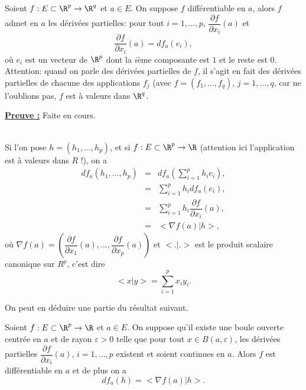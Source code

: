 \documentclass[class=report,crop=false]{standalone}
\begin{document}
 


 \begin{proposition} \label{diffder}
\textcolor[rgb]{0.50,0.00,0.25}{
Soient $f: E \subset \R^p \rightarrow \R^q$ et $a \in E$. On suppose $f$ différentiable en
$a$, alors $f$ admet en $a$ les dérivées partielles: pour tout $i=1,...,p$, $\dfrac{\partial f}{\partial x_i }(a)$ et 
\begin{equation*}
\dfrac{\partial f}{\partial x_i }(a)=df_a(e_i),
\end{equation*}
où $e_i$ est un vecteur de $\R^p$ dont  la $i$ème composante est $1$ et le reste est $0$.\\
Attention: quand on parle des dérivées partielles  de $f$, il s'agit en fait des dérivées partielles
de chacune des applications $f_j$ (avec $f=(f_1, ..., f_q)$, $j=1,...,q$, car ne l'oublions pas, 
$f$ est à valeurs dans $\R^q$.
}
\end{proposition}

\noindent \underline{\bf Preuve :}
Faite en cours.

  \begin{remarque*}
\textcolor[rgb]{0.00,0.00,1.00}{ \\
Si l'on pose $h=(h_1,...,h_p)$, et si $f:E \subset  \R^p \rightarrow \R$ (attention ici 
l'application est à valeurs dans $R$ !), on a 
\begin{equation*}
\begin{array}{lll}
df_a(h_1,...,h_p) & =& df_a (\displaystyle \sum_{i=1}^p h_ie_i),\\
 & =& \displaystyle \sum_{i=1}^p h_i df_a(e_i),\\
 &=& \displaystyle \sum_{i=1}^p h_i  \dfrac{\partial f}{\partial x_i }(a),\\
 & =& <\nabla f(a) \vert h >,
\end{array}
\end{equation*}
où $\nabla f(a)=(\dfrac{\partial f}{\partial x_1 }(a),...,\dfrac{\partial f}{\partial x_p}(a))$ et
$<. \vert . >$ est le produit scalaire canonique sur $R^p$, c'est  dire
\begin{equation*}
<x\vert y>=\displaystyle \sum_{i=1}^p x_i y_i.
\end{equation*}
}
\end{remarque*}

\noindent On peut en déduire une partie du résultat suivant.

 \begin{proposition}
\textcolor[rgb]{0.50,0.00,0.25}{\label{derdiff}
Soient $f: E \subset \R^p \rightarrow \R$ et $a \in E$. On suppose qu'il existe une
boule ouverte centrée en $a$ et de rayon $\varepsilon >0$ telle que pour tout $x \in B(a,\varepsilon)$, les dérivées partielles $\dfrac{\partial f}{\partial x_i }(a)$, $i=1,...,p$
existent et soient continues en $a$. Alors $f$ est différentiable en $a$ et de plus on a 
\begin{equation*}
df_a(h)=<\nabla f(a) \vert h>.
\end{equation*}
}
\end{proposition}
\end{document}
